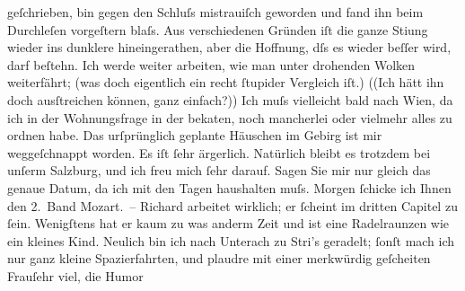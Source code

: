 \begin{ledgroupsized}[t]{13cm}
                    geſchrieben, bin gegen den Schluſs mistrauiſch geworden und fand ihn beim
                    Durchleſen vorgeſtern blaſs. Aus verschiedenen Gründen iſt die ganze Sti{\geminationm}ung wieder ins dunklere hineingerathen, aber die
                    Hoffnung, dſs es wieder beſſer wird, darf beſtehn. Ich werde weiter arbeiten,
                    wie man unter drohenden Wolken weiterfährt; (was doch eigentlich ein recht
                    ſtupider Vergleich iſt.) ((Ich hätt ihn doch ausſtreichen können, ganz
                    einfach?)) \pend
           \pstart
           {\pb}Ich muſs vielleicht bald nach Wien, da ich in der Wohnungsfrage in der beka{\geminationn}ten, noch mancherlei oder vielmehr alles zu
                    ordnen habe. Das urſprünglich geplante Häuschen im Gebirg ist mir weggeſchnappt
                    worden. Es iſt ſehr ärgerlich. Natürlich bleibt es trotzdem bei unſerm Salzburg, und ich freu mich ſehr darauf. Sagen
                    Sie mir nur gleich das genaue Datum, da ich mit den Tagen haushalten muſs.\pend
           \pstart
           Morgen ſchicke ich Ihnen den 2. Band Mozart. – Richard arbeitet wirklich; er
                    ſcheint im dritten Capitel
                    zu ſein. {\pb}Wenigſtens hat er kaum zu was anderm
                    Zeit und ist eine Radelraunzen wie ein kleines Kind.\pend
           \pstart
           Neulich bin ich nach Unterach zu Stri’s geradelt; ſonſt mach ich nur
                    ganz kleine Spazierfahrten, und plaudre mit einer merkwürdig geſcheiten Frauſehr viel, die Humor

\end{ledgroupsized}
